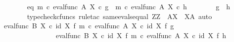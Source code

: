 \begin{isabellebody}
\isanewline
\ \ \ \ \ \ \isamarkupfalse%
\ eq{\isacharcolon}{\kern0pt}\ {\isachardoublequoteopen}{\isacharparenleft}{\kern0pt}m\ {\isasymcirc}\isactrlsub c\ eval{\isacharunderscore}{\kern0pt}func\ A\ X{\isacharparenright}{\kern0pt}\isactrlsup {\isasymsharp}\ {\isasymcirc}\isactrlsub c\ g\ {\isacharequal}{\kern0pt}\ {\isacharparenleft}{\kern0pt}m\ {\isasymcirc}\isactrlsub c\ eval{\isacharunderscore}{\kern0pt}func\ A\ X{\isacharparenright}{\kern0pt}\isactrlsup {\isasymsharp}\ {\isasymcirc}\isactrlsub c\ h{\isachardoublequoteclose}\isanewline
\ \ \ \ \ \ \isamarkupfalse%
\ {\isachardoublequoteopen}g\ {\isacharequal}{\kern0pt}\ h{\isachardoublequoteclose}\isanewline
\ \ \ \ \ \ \isamarkupfalse%
\ {\isacharparenleft}{\kern0pt}typecheck{\isacharunderscore}{\kern0pt}cfuncs{\isacharcomma}{\kern0pt}\ rule{\isacharunderscore}{\kern0pt}tac\ same{\isacharunderscore}{\kern0pt}evals{\isacharunderscore}{\kern0pt}equal{\isacharbrackleft}{\kern0pt}\ Z{\isacharequal}{\kern0pt}Z{\isacharcomma}{\kern0pt}\ \ A{\isacharequal}{\kern0pt}X{\isacharcomma}{\kern0pt}\ \ X{\isacharequal}{\kern0pt}A{\isacharbrackright}{\kern0pt}{\isacharcomma}{\kern0pt}\ auto{\isacharparenright}{\kern0pt}\isanewline
\ \ \ \ \ \ \ \ \ \ \isamarkupfalse%
\ {\isachardoublequoteopen}{\isacharparenleft}{\kern0pt}{\isacharparenleft}{\kern0pt}eval{\isacharunderscore}{\kern0pt}func\ B\ X{\isacharparenright}{\kern0pt}\ {\isasymcirc}\isactrlsub c\ {\isacharparenleft}{\kern0pt}id\ X\ {\isasymtimes}\isactrlsub f\ {\isacharparenleft}{\kern0pt}m\ {\isasymcirc}\isactrlsub c\ eval{\isacharunderscore}{\kern0pt}func\ A\ X{\isacharparenright}{\kern0pt}\isactrlsup {\isasymsharp}{\isacharparenright}{\kern0pt}{\isacharparenright}{\kern0pt}\ {\isasymcirc}\isactrlsub c\ {\isacharparenleft}{\kern0pt}id\ X\ {\isasymtimes}\isactrlsub f\ g{\isacharparenright}{\kern0pt}\ \ {\isacharequal}{\kern0pt}\ \isanewline
\ \ \ \ \ \ \ \ \ \ \ \ \ \ \ \ {\isacharparenleft}{\kern0pt}{\isacharparenleft}{\kern0pt}eval{\isacharunderscore}{\kern0pt}func\ B\ X{\isacharparenright}{\kern0pt}\ {\isasymcirc}\isactrlsub c\ {\isacharparenleft}{\kern0pt}id\ X\ {\isasymtimes}\isactrlsub f\ {\isacharparenleft}{\kern0pt}m\ {\isasymcirc}\isactrlsub c\ eval{\isacharunderscore}{\kern0pt}func\ A\ X{\isacharparenright}{\kern0pt}\isactrlsup {\isasymsharp}{\isacharparenright}{\kern0pt}{\isacharparenright}{\kern0pt}\ {\isasymcirc}\isactrlsub c\ {\isacharparenleft}{\kern0pt}id\ X\ {\isasymtimes}\isactrlsub f\ h{\isacharparenright}{\kern0pt}{\isachardoublequoteclose}\isanewline

\end{isabellebody}
